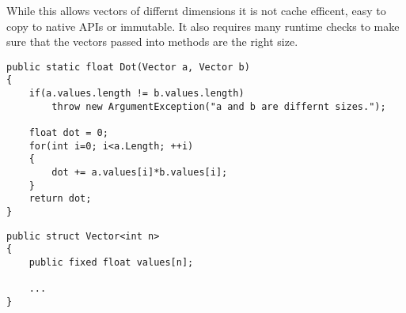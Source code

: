 While this allows vectors of differnt dimensions it is not cache efficent, easy to copy to native APIs or immutable.
It also requires many runtime checks to make sure that the vectors passed into methods are the right size.

\begin{lstlisting}[caption={Runtime checks needed when using arrays}, keywordstyle={\color{blue}},language=sharpc]
public static float Dot(Vector a, Vector b)
{
	if(a.values.length != b.values.length)
		throw new ArgumentException("a and b are differnt sizes.");
		
	float dot = 0;
	for(int i=0; i<a.Length; ++i)
	{
		dot += a.values[i]*b.values[i];
	}
	return dot;
}
\end{lstlisting}



\begin{lstlisting}[caption={A fixed size vector type}, keywordstyle={\color{blue}},language=sharpc]
public struct Vector<int n>
{
	public fixed float values[n];
	
	...
}
\end{lstlisting}